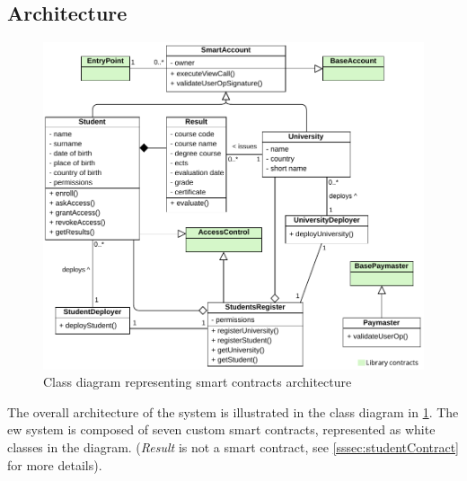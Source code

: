\subsection{Architecture}
\begin{figure}
  \centering
  \includegraphics[width=1\textwidth]{figures/Contracts class diagram.pdf}
  \caption[Smart contracts architecture class diagram]{Class diagram representing smart contracts architecture}
  \label{fig:contractsClass}
\end{figure}

The overall architecture of the system is illustrated in the class diagram in \cref{fig:contractsClass}. The \acrshort{ew} system is composed of seven custom smart contracts, represented as white classes in the diagram. (\textit{Result} is not a smart contract, see \cref{sssec:studentContract} for more details). 

